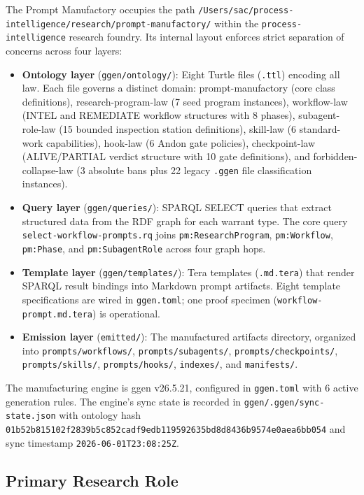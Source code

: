 The Prompt Manufactory occupies the path
\texttt{/Users/sac/process-intelligence/research/prompt-manufactory/} within the
\texttt{process-intelligence} research foundry. Its internal layout enforces strict separation
of concerns across four layers:

\begin{itemize}
  \item \textbf{Ontology layer} (\texttt{ggen/ontology/}): Eight Turtle files (\texttt{.ttl})
    encoding all law. Each file governs a distinct domain: prompt-manufactory (core class
    definitions), research-program-law (7 seed program instances), workflow-law (INTEL and
    REMEDIATE workflow structures with 8 phases), subagent-role-law (15 bounded inspection
    station definitions), skill-law (6 standard-work capabilities), hook-law (6 Andon gate
    policies), checkpoint-law (ALIVE/PARTIAL verdict structure with 10 gate definitions), and
    forbidden-collapse-law (3 absolute bans plus 22 legacy \texttt{.ggen} file classification
    instances).
  \item \textbf{Query layer} (\texttt{ggen/queries/}): SPARQL SELECT queries that extract
    structured data from the RDF graph for each warrant type. The core query
    \texttt{select-workflow-prompts.rq} joins \texttt{pm:ResearchProgram},
    \texttt{pm:Workflow}, \texttt{pm:Phase}, and \texttt{pm:SubagentRole} across four
    graph hops.
  \item \textbf{Template layer} (\texttt{ggen/templates/}): Tera templates (\texttt{.md.tera})
    that render SPARQL result bindings into Markdown prompt artifacts. Eight template
    specifications are wired in \texttt{ggen.toml}; one proof specimen
    (\texttt{workflow-prompt.md.tera}) is operational.
  \item \textbf{Emission layer} (\texttt{emitted/}): The manufactured artifacts directory,
    organized into \texttt{prompts/workflows/}, \texttt{prompts/subagents/},
    \texttt{prompts/checkpoints/}, \texttt{prompts/skills/}, \texttt{prompts/hooks/},
    \texttt{indexes/}, and \texttt{manifests/}.
\end{itemize}

The manufacturing engine is ggen v26.5.21, configured in \texttt{ggen.toml} with 6 active
generation rules. The engine's sync state is recorded in
\texttt{ggen/.ggen/sync-state.json} with ontology hash
\texttt{01b52b815102f2839b5c852cadf9edb119592635bd8d8436b9574e0aea6bb054} and
sync timestamp \texttt{2026-06-01T23:08:25Z}.

\subsection{Primary Research Role}
\label{sec:research-prompt-manufactory-identity-role}

